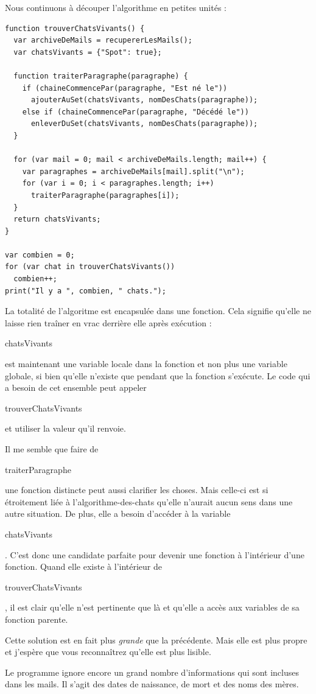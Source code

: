 \documentclass{FramateX}
\renewcommand{\texttt}[1]{\begin{sffamily}{#1}\end{sffamily}}
\begin{document}
Nous continuons à découper l'algorithme en petites unités :

\begin{lstlisting}
function trouverChatsVivants() {
  var archiveDeMails = recupererLesMails();
  var chatsVivants = {"Spot": true};

  function traiterParagraphe(paragraphe) {
    if (chaineCommencePar(paragraphe, "Est né le"))
      ajouterAuSet(chatsVivants, nomDesChats(paragraphe));
    else if (chaineCommencePar(paragraphe, "Décédé le"))
      enleverDuSet(chatsVivants, nomDesChats(paragraphe));
  }

  for (var mail = 0; mail < archiveDeMails.length; mail++) {
    var paragraphes = archiveDeMails[mail].split("\n");
    for (var i = 0; i < paragraphes.length; i++)
      traiterParagraphe(paragraphes[i]);
  }
  return chatsVivants;
}

var combien = 0;
for (var chat in trouverChatsVivants())
  combien++;
print("Il y a ", combien, " chats.");
\end{lstlisting}
La totalité de l'algoritme est encapsulée dans une fonction. Cela
signifie qu'elle ne laisse rien traîner en vrac derrière elle après
exécution : \texttt{chatsVivants} est maintenant une variable locale
dans la fonction et non plus une variable globale, si bien qu'elle
n'existe que pendant que la fonction s'exécute. Le code qui a besoin de
cet ensemble peut appeler \texttt{trouverChatsVivants} et utiliser la
valeur qu'il renvoie.

Il me semble que faire de \texttt{traiterParagraphe} une fonction
distincte peut aussi clarifier les choses. Mais celle-ci est si
étroitement liée à l'algorithme-des-chats qu'elle n'aurait aucun sens
dans une autre situation. De plus, elle a besoin d'accéder à la variable
\texttt{chatsVivants}. C'est donc une candidate parfaite pour devenir
une fonction à l'intérieur d'une fonction. Quand elle existe à
l'intérieur de \texttt{trouverChatsVivants}, il est clair qu'elle n'est
pertinente que là et qu'elle a accès aux variables de sa fonction
parente.

Cette solution est en fait plus \emph{grande} que la précédente. Mais
elle est plus propre et j'espère que vous reconnaîtrez qu'elle est plus
lisible.

\begin{center}\end{center}

Le programme ignore encore un grand nombre d'informations qui sont
incluses dans les mails. Il s'agit des dates de naissance, de mort et
des noms des mères.
\end{document}
